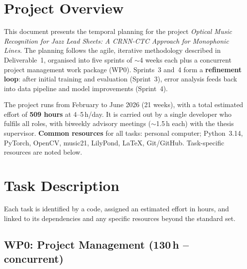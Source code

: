 \documentclass[11pt, a4paper]{article}
\begin{document}
\tableofcontents
\newpage


\section{Project Overview}
\label{sec:overview}

This document presents the temporal planning for the project \emph{Optical Music Recognition for Jazz Lead Sheets: A CRNN-CTC Approach for Monophonic Lines}. The planning follows the agile, iterative methodology described in Deliverable~1, organised into five sprints of $\sim$4 weeks each plus a concurrent project management work package (WP0). Sprints~3 and~4 form a \textbf{refinement loop}: after initial training and evaluation (Sprint~3), error analysis feeds back into data pipeline and model improvements (Sprint~4).

The project runs from February to June 2026 (21 weeks), with a total estimated effort of \textbf{509 hours} at 4--5\,h/day. It is carried out by a single developer who fulfils all roles, with biweekly advisory meetings ($\sim$1.5\,h each) with the thesis supervisor. \textbf{Common resources} for all tasks: personal computer; Python~3.14, PyTorch, OpenCV, music21, LilyPond, \LaTeX, Git/GitHub. Task-specific resources are noted below.


\section{Task Description}
\label{sec:tasks}

Each task is identified by a code, assigned an estimated effort in hours, and linked to its dependencies and any specific resources beyond the standard set.

\subsection{WP0: Project Management (130\,h -- concurrent)}
\label{sec:wp0}
\end{document}
